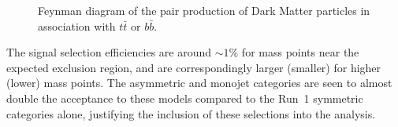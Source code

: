 \begin{figure}[h!] \centering
{}
\caption{Feynman diagram of the pair production of Dark Matter particles in
association with $t\bar{t}$ or $b\bar{b}$. \cite{Abercrombie:2015wmb}}
\label{fig:feynman_hf} \end{figure}


The signal selection efficiencies are around $\sim 1$\% for mass points near the expected exclusion
region, and are correspondingly larger (smaller) for higher (lower) mass points.
The asymmetric and monojet categories are seen to almost double the acceptance
to these models compared to the Run~1 symmetric categories alone, justifying the
inclusion of these selections into the analysis.



